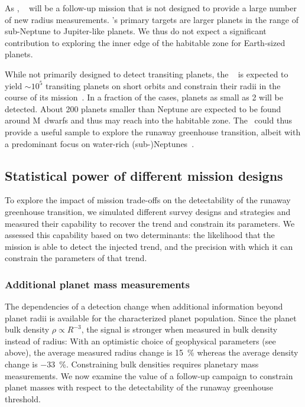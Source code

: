 \documentclass[modern]{aastex631}
\begin{document}
As \cheops, \ariel~\citep{Puig2016} will be a follow-up mission that is not designed to provide a large number of new radius measurements.
\ariel's primary targets are larger planets in the range of sub-Neptune to Jupiter-like planets.
We thus do not expect a significant contribution to exploring the inner edge of the habitable zone for Earth-sized planets.

While not primarily designed to detect transiting planets, the \rst~\citep{Spergel2015} is expected to yield $\sim 10^5$ transiting planets on short orbits and constrain their radii in the course of its mission~\citep{Montet2017}.
In a fraction of the cases, planets as small as \SI{2}{\Rearth} will be detected.
About 200 planets smaller than Neptune are expected to be found around M~dwarfs and thus may reach into the habitable zone.
The \rst\ could thus provide a useful sample to explore the runaway greenhouse transition, albeit with a predominant focus on water-rich (sub-)Neptunes~\citep[e.g.,][]{Pierrehumbert2022}.


\subsection{Statistical power of different mission designs}\label{sec:statpower_missions}
To explore the impact of mission trade-offs on the detectability of the runaway greenhouse transition, we simulated different survey designs and strategies and measured their capability to recover the trend and constrain its parameters.
We assessed this capability based on two determinants: the likelihood that the mission is able to detect the injected trend, and the precision with which it can constrain the parameters of that trend.

\subsubsection{Additional planet mass measurements}\label{sec:res_followup}
The dependencies of a detection change when additional information beyond planet radii is available for the characterized planet population.
Since the planet bulk density $\rho \propto R^{-3}$, the signal is stronger when measured in bulk density instead of radius:
With an optimistic choice of geophysical parameters (see above), the average measured radius change is \SI{+15}{\percent} whereas the average density change is \SI{-33}{\percent}.
Constraining bulk densities requires planetary mass measurements.
We now examine the value of a follow-up campaign to constrain planet masses with respect to the detectability of the runaway greenhouse threshold.
\end{document}
